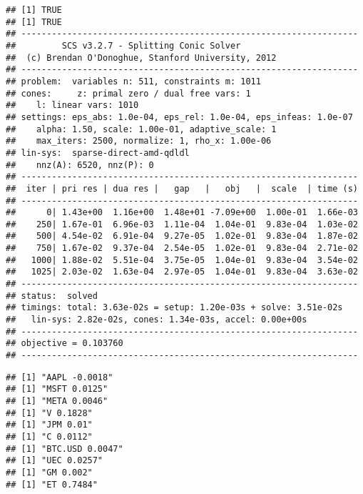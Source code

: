 \documentclass[
]{article}
\newenvironment{Shaded}{\begin{snugshade}}{\end{snugshade}}
\newcommand{\ControlFlowTok}[1]{\textcolor[rgb]{0.13,0.29,0.53}{\textbf{#1}}}
\newcommand{\DecValTok}[1]{\textcolor[rgb]{0.00,0.00,0.81}{#1}}
\newcommand{\FunctionTok}[1]{\textcolor[rgb]{0.13,0.29,0.53}{\textbf{#1}}}
\newcommand{\NormalTok}[1]{#1}
\newcommand{\SpecialCharTok}[1]{\textcolor[rgb]{0.81,0.36,0.00}{\textbf{#1}}}
\newcommand{\StringTok}[1]{\textcolor[rgb]{0.31,0.60,0.02}{#1}}
\begin{document}
\begin{verbatim}
## [1] TRUE
## [1] TRUE
## ------------------------------------------------------------------
##         SCS v3.2.7 - Splitting Conic Solver
##  (c) Brendan O'Donoghue, Stanford University, 2012
## ------------------------------------------------------------------
## problem:  variables n: 511, constraints m: 1011
## cones:     z: primal zero / dual free vars: 1
##    l: linear vars: 1010
## settings: eps_abs: 1.0e-04, eps_rel: 1.0e-04, eps_infeas: 1.0e-07
##    alpha: 1.50, scale: 1.00e-01, adaptive_scale: 1
##    max_iters: 2500, normalize: 1, rho_x: 1.00e-06
## lin-sys:  sparse-direct-amd-qdldl
##    nnz(A): 6520, nnz(P): 0
## ------------------------------------------------------------------
##  iter | pri res | dua res |   gap   |   obj   |  scale  | time (s)
## ------------------------------------------------------------------
##      0| 1.43e+00  1.16e+00  1.48e+01 -7.09e+00  1.00e-01  1.66e-03 
##    250| 1.67e-01  6.96e-03  1.11e-04  1.04e-01  9.83e-04  1.03e-02 
##    500| 4.54e-02  6.91e-04  9.27e-05  1.02e-01  9.83e-04  1.87e-02 
##    750| 1.67e-02  9.37e-04  2.54e-05  1.02e-01  9.83e-04  2.71e-02 
##   1000| 1.88e-02  5.51e-04  3.75e-05  1.04e-01  9.83e-04  3.54e-02 
##   1025| 2.03e-02  1.63e-04  2.97e-05  1.04e-01  9.83e-04  3.63e-02 
## ------------------------------------------------------------------
## status:  solved
## timings: total: 3.63e-02s = setup: 1.20e-03s + solve: 3.51e-02s
##   lin-sys: 2.82e-02s, cones: 1.34e-03s, accel: 0.00e+00s
## ------------------------------------------------------------------
## objective = 0.103760
## ------------------------------------------------------------------
\end{verbatim}

\begin{Shaded}
\end{Shaded}

\begin{verbatim}
## [1] "AAPL -0.0018"
## [1] "MSFT 0.0125"
## [1] "META 0.0046"
## [1] "V 0.1828"
## [1] "JPM 0.01"
## [1] "C 0.0112"
## [1] "BTC.USD 0.0047"
## [1] "UEC 0.0257"
## [1] "GM 0.002"
## [1] "ET 0.7484"
\end{verbatim}
\end{document}
